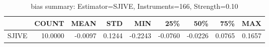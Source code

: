\begin{table}[ht]
\centering
\caption{bias summary: Estimator=SJIVE, Instruments=166, Strength=0.10}
\begin{tabular}{lrrrrrrrr}
\toprule
 & COUNT & MEAN & STD & MIN & 25\% & 50\% & 75\% & MAX \\
\midrule
SJIVE & 10.0000 & -0.0097 & 0.1244 & -0.2243 & -0.0760 & -0.0226 & 0.0765 & 0.1657 \\
\bottomrule
\end{tabular}
\end{table}

